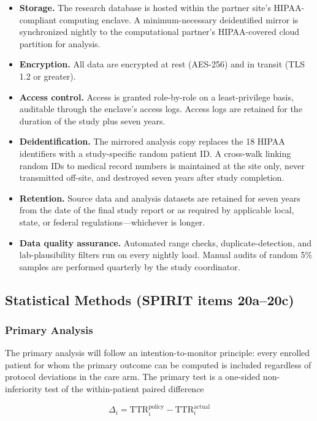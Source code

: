 \documentclass[11pt]{article}
\begin{document}
\begin{itemize}
  \item \textbf{Storage.} The research database is hosted within the partner site's HIPAA-compliant computing enclave. A minimum-necessary deidentified mirror is synchronized nightly to the computational partner's HIPAA-covered cloud partition for analysis.
  \item \textbf{Encryption.} All data are encrypted at rest (AES-256) and in transit (TLS 1.2 or greater).
  \item \textbf{Access control.} Access is granted role-by-role on a least-privilege basis, auditable through the enclave's access logs. Access logs are retained for the duration of the study plus seven years.
  \item \textbf{Deidentification.} The mirrored analysis copy replaces the 18 HIPAA identifiers with a study-specific random patient ID. A cross-walk linking random IDs to medical record numbers is maintained at the site only, never transmitted off-site, and destroyed seven years after study completion.
  \item \textbf{Retention.} Source data and analysis datasets are retained for seven years from the date of the final study report or as required by applicable local, state, or federal regulations---whichever is longer.
  \item \textbf{Data quality assurance.} Automated range checks, duplicate-detection, and lab-plausibility filters run on every nightly load. Manual audits of random 5\% samples are performed quarterly by the study coordinator.
\end{itemize}

\subsection{Statistical Methods (SPIRIT items 20a--20c)}
\label{sec:stats}

\subsubsection{Primary Analysis}

The primary analysis will follow an intention-to-monitor principle: every enrolled patient for whom the primary outcome can be computed is included regardless of protocol deviations in the care arm. The primary test is a one-sided non-inferiority test of the within-patient paired difference

\begin{equation}
  \Delta_i = \mathrm{TTR}_i^{\mathrm{policy}} - \mathrm{TTR}_i^{\mathrm{actual}}
\end{equation}
\end{document}
